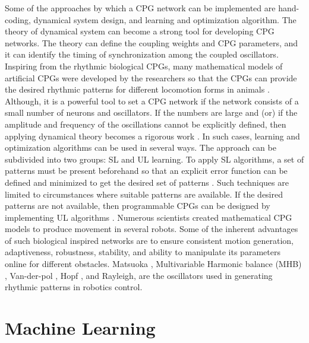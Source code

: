 Some of the approaches by which a \ac{CPG} network can be implemented are hand-coding, dynamical system design, and learning and optimization algorithm. The theory of dynamical system can become a strong tool for developing CPG networks. The theory can define the coupling weights and \ac{CPG} parameters, and it can identify the timing of synchronization among the coupled oscillators. Inspiring from the rhythmic biological \ac{CPG}s, many mathematical models of artificial \ac{CPG}s were developed by the researchers so that the \ac{CPG}s can provide the desired rhythmic patterns for different locomotion forms in animals \cite{ijspeert2008central,iwasaki2006analysis,righetti2006dynamic}. Although, it is a powerful tool to set a \ac{CPG} network if the network consists of a small number of neurons and oscillators. If the numbers are large and (or) if the amplitude and frequency of the oscillations cannot be explicitly defined, then applying dynamical theory becomes a rigorous work \cite{fang2016cpg,kim2009central}. In such cases, learning and optimization algorithms can be used in several ways. The approach can be subdivided into two groups: \ac{SL} and \ac{UL} learning. To apply \ac{SL} algorithms, a set of patterns must be present beforehand so that an explicit error function can be defined and minimized to get the desired set of patterns \cite{fang2016cpg,nakanishi2004learning}. Such techniques are limited to circumstances where suitable patterns are available. If the desired patterns are not available, then programmable \ac{CPG}s can be designed by implementing \ac{UL} algorithms \cite{righetti2006dynamic,ijspeert2004simple}.
Numerous scientists created mathematical \ac{CPG} models to produce movement in several robots. Some of the inherent advantages of such biological inspired networks are to ensure consistent motion generation, adaptiveness, robustness, stability, and ability to manipulate its parameters online for different obstacles. Matsuoka \cite{matsuoka1985sustained}, Multivariable Harmonic balance (MHB) \cite{iwasaki2006analysis,iwasaki2008multivariable}, Van-der-pol \cite{righetti2006dynamic}, Hopf \cite{wang2017cpg}, and Rayleigh, are the oscillators used in generating rhythmic patterns in robotics control.

\section{Machine Learning}

